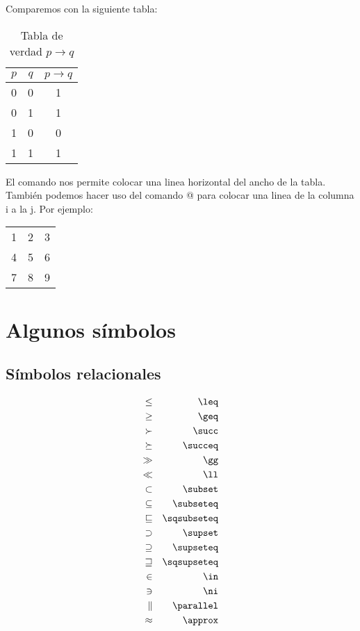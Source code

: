 \documentclass[letterpaper,12pt]{book}
\begin{document}
Comparemos con la siguiente tabla:

\begin{table}[h!]
\centering
\begin{tabular}{|c|c|c|} \hline
$p$ & $q$ & $p \rightarrow q$\\\hline
0 & 0 & 1 \\
0 & 1 & 1 \\
1 & 0 & 0 \\
1 & 1 & 1 \\\hline
\end{tabular}
\caption{Tabla de verdad $p \rightarrow q$}
\end{table}

El comando \verb@\hline@ nos permite colocar una linea horizontal
del ancho de la tabla. También podemos hacer uso del comando
\verb@{}@ para colocar una linea de la columna i a la j.
Por ejemplo:

\begin{table}[h!]
\centering
\begin{tabular}{| l | c | r | }
	\hline
   1 & 2 & 3 \\
   \cline{1-2}
   4 & 5 & 6 \\
   \cline{2-2}
   7 & 8 & 9 \\
   \hline
 \end{tabular}
\end{table}

\appendix
\chapter{Algunos símbolos}

\section{Símbolos relacionales}

\begin{equation*}
\begin{aligned}
\leq & & \verb@\leq@ \\
\geq &	& \verb@\geq@ \\
\succ &	& \verb@\succ@ \\
\succeq & & \verb@\succeq@ \\
\gg	 &	& \verb@\gg@ \\
\ll & & \verb@\ll@ \\
\subset & & \verb@\subset@ \\
\subseteq & & \verb@\subseteq@ \\
\sqsubseteq & & \verb@\sqsubseteq@ \\
\supset & & \verb@\supset@ \\
\supseteq & & \verb@\supseteq@ \\
\sqsupseteq & & \verb@\sqsupseteq@ \\
\in & & \verb@\in@ \\
\ni & & \verb@\ni@ \\
\parallel & & \verb@\parallel@ \\
\approx & & \verb@\approx@
\end{aligned}
\end{equation*}
\end{document}
